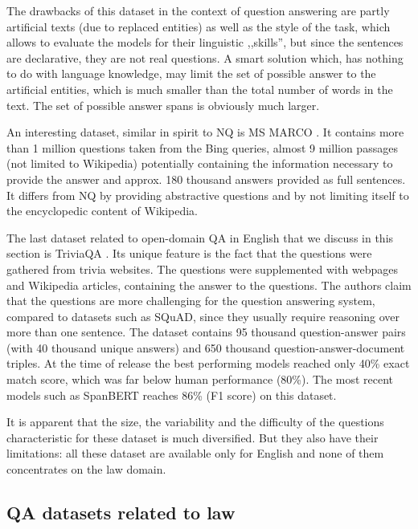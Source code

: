 The drawbacks of this dataset in the context of question answering are partly artificial texts (due to replaced entities) as well as the style of the task, which allows to evaluate the models for their linguistic ,,skills'', but since the sentences are declarative, they are not real questions. A smart solution which, has nothing to do with language knowledge, may limit the set of possible answer to the artificial entities, which is much smaller than the total number of words in the text. The set of  possible answer spans is obviously much larger.

An interesting dataset, similar in spirit to NQ is MS MARCO \cite{bajaj2016ms}. It contains more than 1 million questions taken from the Bing queries, almost 9 million passages (not limited to Wikipedia) potentially containing the information necessary to provide the answer and approx. 180 thousand answers provided as full sentences. It differs from NQ by providing abstractive questions and by not limiting itself to the encyclopedic content of Wikipedia.

The last dataset related to open-domain QA in English that we discuss in this section is TriviaQA
\cite{joshi2017triviaqa}. Its unique feature is the fact that the questions were gathered from trivia websites. The questions were supplemented with webpages and Wikipedia articles, containing the answer to the questions. The authors claim that the questions are more challenging for the question answering system, compared to datasets such as SQuAD, since they usually require reasoning over more than one sentence. The dataset contains 95 thousand question-answer pairs (with 40 thousand unique answers) and 650 thousand question-answer-document triples. At the time of release the best performing
models reached only 40\% exact match score, which was far below human performance (80\%). The most recent models such as SpanBERT \cite{joshi2020spanbert} reaches 86\% (F1 score) on this dataset.

It is apparent that the size, the variability and the difficulty of the questions characteristic for these dataset is much diversified. But they also have their limitations: all these dataset are available only for English and none of them concentrates on the law domain.

\subsection{QA datasets related to law}

